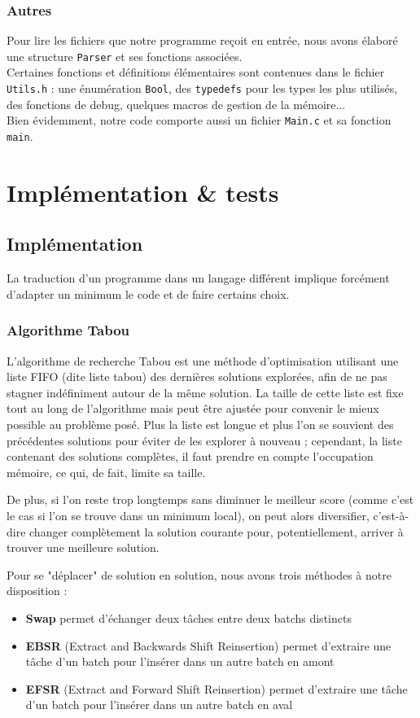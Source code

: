 \documentclass[hideweeklyreports]{polytech/polytech}
\newcommand{\codec}[1]{\texttt{#1}}
\begin{document}
			\subsection{Autres}
				Pour lire les fichiers que notre programme reçoit en entrée, nous avons élaboré une structure \codec{Parser} et ses fonctions associées.\\
				Certaines fonctions et définitions élémentaires sont contenues dans le fichier \codec{Utils.h} : une énumération \codec{Bool}, des \codec{typedefs} pour les types les plus utilisés, des fonctions de debug, quelques macros de gestion de la mémoire...\\
				Bien évidemment, notre code comporte aussi un fichier \codec{Main.c} et sa fonction \codec{main}.

		
	\chapter{Implémentation \& tests}
		\section{Implémentation}
			La traduction d'un programme dans un langage différent implique forcément d'adapter un minimum le code et de faire certains choix.
			
			\subsection{Algorithme Tabou}
				L'algorithme de recherche Tabou est une méthode d'optimisation utilisant une liste FIFO (dite liste tabou) des dernières solutions explorées, afin de ne pas stagner indéfiniment autour de la même solution. La taille de cette liste est fixe tout au long de l'algorithme mais peut être ajustée pour convenir le mieux possible au problème posé. Plus la liste est longue et plus l'on se souvient des précédentes solutions pour éviter de les explorer à nouveau ; cependant, la liste contenant des solutions complètes, il faut prendre en compte l'occupation mémoire, ce qui, de fait, limite sa taille.
				
				De plus, si l'on reste trop longtemps sans diminuer le meilleur score (comme c'est le cas si l'on se trouve dans un minimum local), on peut alors diversifier, c'est-à-dire changer complètement la solution courante pour, potentiellement, arriver à trouver une meilleure solution.
				
				\label{methR}
				Pour se "déplacer" de solution en solution, nous avons trois méthodes à notre disposition :
				\begin{itemize}
					\item \textbf{Swap} permet d'échanger deux tâches entre deux batchs distincts
					\item \textbf{EBSR} (Extract and Backwards Shift Reinsertion) permet d'extraire une tâche d'un batch pour l'insérer dans un autre batch en amont
					\item \textbf{EFSR} (Extract and Forward Shift Reinsertion) permet d'extraire une tâche d'un batch pour l'insérer dans un autre batch en aval
				\end{itemize}
			
\end{document}
